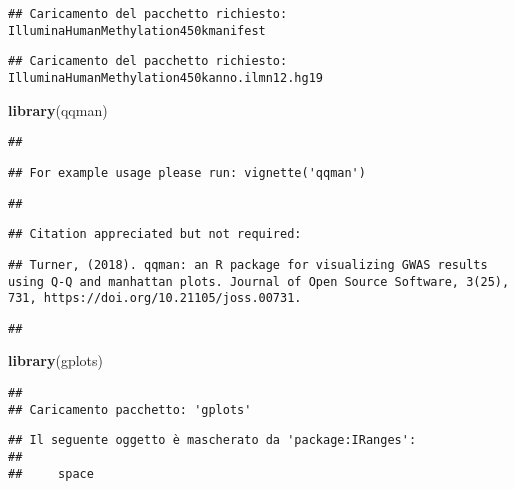 \documentclass[
]{article}
\newenvironment{Shaded}{\begin{snugshade}}{\end{snugshade}}
\newcommand{\FunctionTok}[1]{\textcolor[rgb]{0.13,0.29,0.53}{\textbf{#1}}}
\newcommand{\NormalTok}[1]{#1}
\begin{document}
\begin{verbatim}
## Caricamento del pacchetto richiesto: IlluminaHumanMethylation450kmanifest
\end{verbatim}

\begin{verbatim}
## Caricamento del pacchetto richiesto: IlluminaHumanMethylation450kanno.ilmn12.hg19
\end{verbatim}

\begin{Shaded}
\begin{Highlighting}[]
\FunctionTok{library}\NormalTok{(qqman)}
\end{Highlighting}
\end{Shaded}

\begin{verbatim}
## 
\end{verbatim}

\begin{verbatim}
## For example usage please run: vignette('qqman')
\end{verbatim}

\begin{verbatim}
## 
\end{verbatim}

\begin{verbatim}
## Citation appreciated but not required:
\end{verbatim}

\begin{verbatim}
## Turner, (2018). qqman: an R package for visualizing GWAS results using Q-Q and manhattan plots. Journal of Open Source Software, 3(25), 731, https://doi.org/10.21105/joss.00731.
\end{verbatim}

\begin{verbatim}
## 
\end{verbatim}

\begin{Shaded}
\begin{Highlighting}[]
\FunctionTok{library}\NormalTok{(gplots)}
\end{Highlighting}
\end{Shaded}

\begin{verbatim}
## 
## Caricamento pacchetto: 'gplots'
\end{verbatim}

\begin{verbatim}
## Il seguente oggetto è mascherato da 'package:IRanges':
## 
##     space
\end{verbatim}
\end{document}
